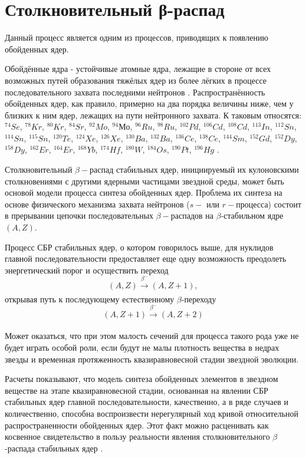 \documentclass[14pt, a4paper]{article}
\numberwithin{figure}{section}
\numberwithin{equation}{section}
\begin{document}
\section{Столкновительный β-распад}
Данный процесс является одним из процессов, приводящих к появлению обойденных ядер.

Обойдённые ядра - устойчивые атомные ядра, лежащие в стороне от всех возможных путей образования тяжёлых ядер из более лёгких в процессе последовательного захвата последними нейтронов \cite{reactions}. Распространённость обойденных ядер, как правило, примерно на два порядка величины ниже, чем у близких к ним ядер, лежащих на пути нейтронного захвата. К таковым относятся: $^{74}Se$, $^{78}Kr$, $^{80}Kr$, $^{84}Sr$, $^{92}Mo$, $^{94}Мо$, $^{96}Ru$, $^{98}Ru$, $^{102}Pd$, $^{106}Cd$, $^{108}Cd$, $^{113}In$, $^{112}Sn$, $^{114}Sn$, $^{115}Sn$, $^{120}Te$, $^{124}Xe$, $^{126}Xe$, $^{130}Ba$, $^{132}Ba$, $^{136}Ce$, $^{138}Ce$, $^{144}Sm$, $^{152}Gd$, $^{152}Dy$, $^{158}Dy$, $^{162}Er$, $^{164}Er$, $^{168}Yb$, $^{174}Hf$, $^{180}W$, $^{184}Os$, $^{190}Pt$, $^{196}Hg$ \cite{role}.

Столкновительный $\beta-$распад стабильных ядер, инициируемый их кулоновскими столкновениями с другими ядерными частицами звездной среды, может быть основой модели процесса синтеза обойденных ядер.
Проблема их синтеза на основе физического механизма захвата нейтронов ($s-$ или $r-$процесса) состоит в прерывании цепочки последовательных $\beta-$распадов на $\beta$-стабильном ядре $(A,Z)$.

Процесс СБР стабильных ядер, о котором говорилось выше, для нуклидов главной последовательности предоставляет еще одну возможность преодолеть энергетический порог и осуществить переход 
$$(A,Z) \xrightarrow[]{\beta^-} (A,Z + 1),$$
открывая путь к последующему естественному $\beta$-переходу
$$(A,Z+1) \xrightarrow[]{\beta^-} (A,Z + 2)$$

Может оказаться, что при этом малость сечений для процесса такого рода уже не будет играть особой роли, если будут не малы плотность вещества в недрах звезды и временная протяженность квазиравновесной стадии звездной эволюции.

Расчеты показывают, что модель синтеза обойденных элементов в звездном веществе на этапе квазиравновесной стадии, основанная на явлении СБР стабильных ядер главной последовательности, качественно, а в ряде случаев и количественно, способна воспроизвести нерегулярный ход кривой относительной распространенности обойденных ядер. Этот факт можно расценивать как косвенное свидетельство в пользу реальности явления столкновительного $\beta$-распада стабильных ядер \cite{tak}.
\end{document}
